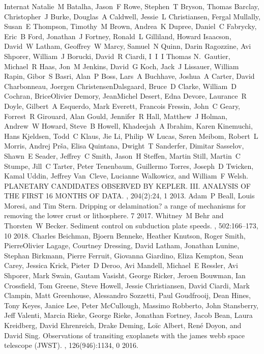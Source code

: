 \documentclass[letterpaper,10pt,english]{jupyterBook}
\begin{document}
\begin{sphinxthebibliography}{Internat}
Natalie M Batalha, Jason F Rowe, Stephen T Bryson, Thomas Barclay, Christopher J Burke, Douglas A Caldwell, Jessie L Christiansen, Fergal Mullally, Susan E Thompson, Timothy M Brown, Andrea K Dupree, Daniel C Fabrycky, Eric B Ford, Jonathan J Fortney, Ronald L Gilliland, Howard Isaacson, David W Latham, Geoffrey W Marcy, Samuel N Quinn, Darin Ragozzine, Avi Shporer, William J Borucki, David R Ciardi, I I I Thomas N. Gautier, Michael R Haas, Jon M Jenkins, David G Koch, Jack J Lissauer, William Rapin, Gibor S Basri, Alan P Boss, Lars A Buchhave, Joshua A Carter, David Charbonneau, Joergen Christensen\sphinxhyphen{}Dalsgaard, Bruce D Clarke, William D Cochran, Brice\sphinxhyphen{}Olivier Demory, Jean\sphinxhyphen{}Michel Desert, Edna Devore, Laurance R Doyle, Gilbert A Esquerdo, Mark Everett, Francois Fressin, John C Geary, Forrest R Girouard, Alan Gould, Jennifer R Hall, Matthew J Holman, Andrew W Howard, Steve B Howell, Khadeejah A Ibrahim, Karen Kinemuchi, Hans Kjeldsen, Todd C Klaus, Jie Li, Philip W Lucas, Søren Meibom, Robert L Morris, Andrej Prša, Elisa Quintana, Dwight T Sanderfer, Dimitar Sasselov, Shawn E Seader, Jeffrey C Smith, Jason H Steffen, Martin Still, Martin C Stumpe, Jill C Tarter, Peter Tenenbaum, Guillermo Torres, Joseph D Twicken, Kamal Uddin, Jeffrey Van Cleve, Lucianne Walkowicz, and William F Welsh. PLANETARY CANDIDATES OBSERVED BY KEPLER. III. ANALYSIS OF THE FIRST 16 MONTHS OF DATA. , 204(2):24, 1 2013.
\sphinxAtStartPar
Adam P Beall, Louis Moresi, and Tim Stern. Dripping or delamination? a range of mechanisms for removing the lower crust or lithosphere. 7 2017.
\sphinxAtStartPar
Whitney M Behr and Thorsten W Becker. Sediment control on subduction plate speeds. , 502:166–173, 10 2018.
\sphinxAtStartPar
Charles Beichman, Bjoern Benneke, Heather Knutson, Roger Smith, Pierre\sphinxhyphen{}Olivier Lagage, Courtney Dressing, David Latham, Jonathan Lunine, Stephan Birkmann, Pierre Ferruit, Giovanna Giardino, Eliza Kempton, Sean Carey, Jessica Krick, Pieter D Deroo, Avi Mandell, Michael E Ressler, Avi Shporer, Mark Swain, Gautam Vasisht, George Ricker, Jeroen Bouwman, Ian Crossfield, Tom Greene, Steve Howell, Jessie Christiansen, David Ciardi, Mark Clampin, Matt Greenhouse, Alessandro Sozzetti, Paul Goudfrooij, Dean Hines, Tony Keyes, Janice Lee, Peter McCullough, Massimo Robberto, John Stansberry, Jeff Valenti, Marcia Rieke, George Rieke, Jonathan Fortney, Jacob Bean, Laura Kreidberg, David Ehrenreich, Drake Deming, Loïc Albert, René Doyon, and David Sing. Observations of transiting exoplanets with the james webb space telescope (JWST). , 126(946):1134, 0 2016.

\end{sphinxthebibliography}
\end{document}
